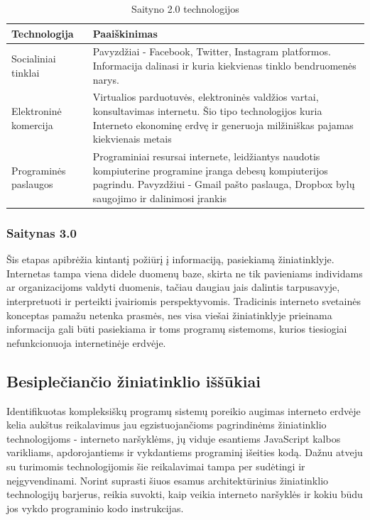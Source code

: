 \documentclass{VUMIFPSkursinis}
\begin{document}
\begin{table}[H]
  \centering
  \caption{Saityno 2.0 technologijos}
  {\begin{tabular}{|m{13em}|m{13em}|} \hline
     Technologija & Paaiškinimas \\
    \hline
    Socialiniai tinklai & Pavyzdžiai - Facebook, Twitter, Instagram platformos. Informacija dalinasi ir kuria kiekvienas tinklo bendruomenės narys.\\
 \hline
Elektroninė komercija &
     Virtualios parduotuvės, elektroninės valdžios vartai, konsultavimas internetu. Šio tipo technologijos kuria Interneto ekonominę erdvę ir generuoja milžiniškas pajamas kiekvienais metais\\
    \hline
     Programinės paslaugos & Programiniai resursai internete, leidžiantys naudotis kompiuterine programine įranga debesų kompiuterijos pagrindu. Pavyzdžiui - Gmail pašto paslauga, Dropbox bylų saugojimo ir dalinimosi įrankis \\
     \hline
  \end{tabular}}
  \label{tab:kompiliavimas_interpretavimas}
\end{table}

\subsubsection{Saitynas 3.0}
Šis etapas apibrėžia kintantį požiūrį į informaciją, pasiekiamą žiniatinklyje. Internetas tampa viena didele duomenų baze, skirta ne tik pavieniams individams ar organizacijoms valdyti duomenis, tačiau daugiau jais dalintis tarpusavyje, interpretuoti ir perteikti įvairiomis perspektyvomis. Tradicinis interneto svetainės konceptas pamažu netenka prasmės, nes visa viešai žiniatinklyje prieinama informacija gali būti pasiekiama ir toms programų sistemoms, kurios tiesiogiai nefunkcionuoja internetinėje erdvėje.

\subsection{Besiplečiančio žiniatinklio iššūkiai}
Identifikuotas kompleksiškų programų sistemų poreikio augimas interneto erdvėje kelia aukštus reikalavimus jau egzistuojančioms pagrindinėms žiniatinklio technologijoms - interneto naršyklėms, jų viduje esantiems JavaScript kalbos varikliams, apdorojantiems ir vykdantiems programinį išeities kodą. Dažnu atveju su turimomis technologijomis šie reikalavimai tampa per sudėtingi ir neįgyvendinami. Norint suprasti šiuos esamus architektūrinius žiniatinklio technologijų barjerus, reikia suvokti, kaip veikia interneto naršyklės ir kokiu būdu jos vykdo programinio kodo instrukcijas.
\end{document}
